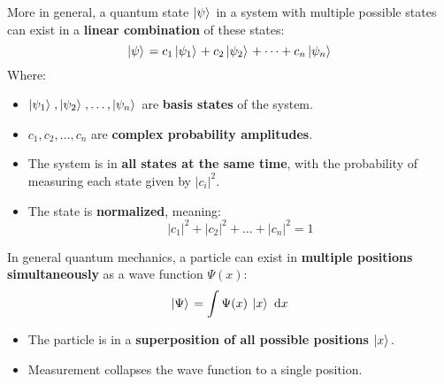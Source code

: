 \highspace
More in general, a quantum state $\left| \psi \rangle\right.$ in a system with multiple possible states can exist in a \textbf{linear combination} of these states:
\begin{equation*}
    \left| \psi \rangle\right. = c_{1} \left| \psi_{1} \rangle\right. + c_{2} \left| \psi_{2} \rangle\right. + \dots + c_{n} \left| \psi_{n} \rangle\right.    
\end{equation*}
Where:
\begin{itemize}
    \item $\left| \psi_{1} \rangle\right., \left| \psi_{2} \rangle\right., \dots, \left| \psi_{n} \rangle\right.$ are \textbf{basis states} of the system.
    
    \item $c_{1}, c_{2}, \dots, c_{n}$ are \textbf{complex probability amplitudes}.

    \item The system is in \textbf{all states at the same time}, with the probability of measuring each state given by $\left|c_{i}\right|^{2}$.

    \item The state is \textbf{normalized}, meaning:
    \begin{equation*}
        \left|c_{1}\right|^{2} + \left|c_{2}\right|^{2} + \dots + \left|c_{n}\right|^{2} = 1
    \end{equation*}
\end{itemize}

\newpage

\begin{examplebox}
    In general quantum mechanics, a particle can exist in \textbf{multiple positions simultaneously} as a wave function $\Psi(x)$:
    \begin{equation*}
        \left| \Psi \rangle\right. = \displaystyle\int \Psi(x) \: \left| x \rangle\right. \: \mathrm{d}x  
    \end{equation*}
    \begin{itemize}
      \item The particle is in a \textbf{superposition of all possible positions} $\left| x \rangle\right.$.
      \item Measurement collapses the wave function to a single position.
    \end{itemize}
\end{examplebox}

